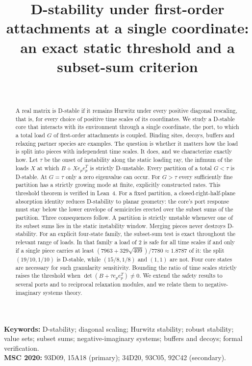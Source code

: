 \documentclass[11pt,a4paper]{article}
\title{D-stability under first-order attachments at a single coordinate:\\ an exact static threshold and a subset-sum criterion}
\author{\PaperAuthor\\[2pt]\small\PaperAffiliation}
\date{\PaperDate}
\theoremstyle{plain}
\theoremstyle{definition}
\theoremstyle{remark}
\begin{document}
\maketitle

\begin{abstract}
A real matrix is D-stable if it remains Hurwitz under every positive diagonal
rescaling, that is, for every choice of positive time scales of its
coordinates. We study a D-stable core that interacts with its environment
through a single coordinate, the port, to which a total load $G$ of
first-order attachments is coupled. Binding sites, decoys, buffers and
relaxing partner species are examples. The question is whether it matters how
the load is split into pieces with independent time scales. It does, and we
characterize exactly how. Let $\tau$ be the onset of instability along the static loading ray, the
infimum of the loads $X$ at which $B+Xe_pe_p^{T}$ is strictly D-unstable. Every partition of a total
$G<\tau$ is D-stable. At $G=\tau$ only a zero eigenvalue can occur. For
$G>\tau$ every sufficiently fine partition has a strictly growing mode at
finite, explicitly constructed rates. This threshold theorem is verified in
Lean~4. For a fixed partition, a closed-right-half-plane absorption identity
reduces D-stability to planar geometry: the core's
port response must stay below the lower envelope of semicircles erected over
the subset sums of the partition. Three
consequences follow. A partition is strictly unstable whenever one of its
subset sums lies in the static instability window. Merging pieces never
destroys D-stability. For an
explicit four-state family, the subset-sum test is exact throughout the
relevant range of loads. In that family a load of $2$ is safe for all time scales if and only
if a single piece carries at least $(7963+329\sqrt{409})/7780\approx1.8787$
of it: the split $(19/10,1/10)$ is D-stable, while $(15/8,1/8)$ and
$(1,1)$ are not. Four core states are necessary for such granularity
sensitivity. Bounding the ratio of time scales strictly raises the threshold
when $\det(B+\tau e_pe_p^{T})\ne0$. We extend the safety results to several
ports and to reciprocal relaxation modules, and we relate them to
negative-imaginary systems theory.
\end{abstract}

\noindent\textbf{Keywords:} D-stability; diagonal scaling; Hurwitz stability;
robust stability; value sets; subset sums; negative-imaginary systems;
buffers and decoys; formal verification.\\[2pt]
\textbf{MSC 2020:} 93D09, 15A18 (primary); 34D20, 93C05, 92C42 (secondary).
\end{document}
